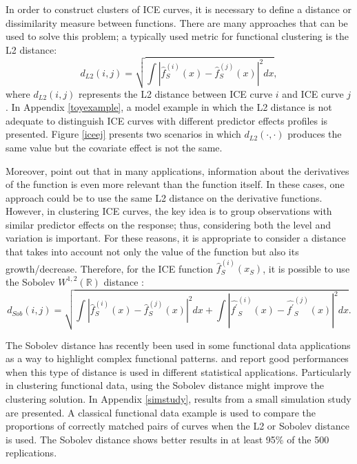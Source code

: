 \documentclass[smallextended,natbib]{svjour3}\usepackage[]{graphicx}\usepackage[]{xcolor}
\newcommand{\1}[1]{\mathbbm{1}_{#1}}
\begin{document}
In order to construct clusters of ICE curves, it is necessary to define a distance or dissimilarity measure between functions. There are many approaches that can be used to solve this problem; a typically used metric for functional clustering is the L2 distance: 
\[ d_{L2}(i, j) = \sqrt{ \int |\hat{f}_{S}^{(i)}(x) - \hat{f}_{S}^{(j)}(x)|^2dx}, \] 
where $d_{L2}(i, j)$ represents the L2 distance between ICE curve $i$ and ICE curve $j$. In Appendix \ref{toyexample}, a model example in which the L2 distance is not adequate to distinguish ICE curves with different predictor effects profiles is presented. Figure \ref{iceej} presents two scenarios in which $d_{L2}(\cdot,\cdot)$ produces the same value but the covariate effect is not the same. 

Moreover, \cite{hitchcock2015clustering} point out that in many applications, information about the derivatives of the function is even more relevant than the function itself.  In these cases, one approach could be to use the same L2 distance on the derivative functions. However, in clustering ICE curves, the key idea is to group observations with similar predictor effects on the response; thus, considering both the level and variation is important. For these reasons, it is appropriate to consider a distance that takes into account not only the value of the function but also its growth/decrease. Therefore, for the ICE function $\hat{f}_{S}^{(i)}(x_S)$, it is possible to use the Sobolev $W^{1,2}(\mathbb{R})$ distance \citep{sobolev}:  
\begin{equation}
\label{sobodis}
d_{Sob}(i, j) = \sqrt{ \int |\hat{f}_{S}^{(i)}(x) - \hat{f}_{S}^{(j)}(x)|^2dx + \int |\hat{f^{'}}_{S}^{(i)}(x) - \hat{f^{'}}_{S}^{(j)}(x)|^2dx}.    
\end{equation}  

The Sobolev distance has recently been used in some functional data applications as a way to highlight complex functional patterns. \cite{cremona2023probabilistic} and \cite{ehsani2020robust} report good performances when this type of distance is used in different statistical applications. Particularly in clustering functional data, using the Sobolev distance might improve the clustering solution. In Appendix \ref{simstudy}, results from a small simulation study are presented.  A classical functional data example \citep{hitchcock2007effect} is used to compare the proportions of correctly matched pairs of curves when the L2 or Sobolev distance is used. The Sobolev distance shows better results in at least 95\% of the 500 replications.   
\end{document}
